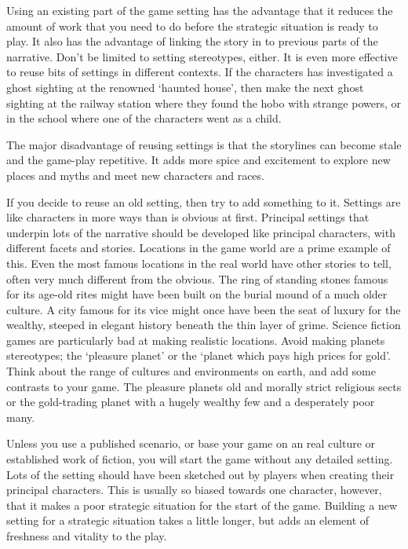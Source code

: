 \documentclass[twoside]{book}
\begin{document}
Using an existing part of the game setting has the advantage that it
reduces the amount of work that you need to do before the strategic
situation is ready to play. It also has the advantage of linking the
story in to previous parts of the narrative. Don't be limited to
setting stereotypes, either. It is even more effective to reuse bits
of settings in different contexts. If the characters has investigated
a ghost sighting at the renowned `haunted house', then make the next
ghost sighting at the railway station where they found the hobo with
strange powers, or in the school where one of the characters went as a
child.

The major disadvantage of reusing settings is that the storylines can
become stale and the game-play repetitive. It adds more spice and
excitement to explore new places and myths and meet new characters and
races.

If you decide to reuse an old setting, then try to add something to
it. Settings are like characters in more ways than is obvious at
first. Principal settings that underpin lots of the narrative should
be developed like principal characters, with different facets and
stories. Locations in the game world are a prime example of this. Even
the most famous locations in the real world have other stories to
tell, often very much different from the obvious. The ring of standing
stones famous for its age-old rites might have been built on the
burial mound of a much older culture. A city famous for its vice might
once have been the seat of luxury for the wealthy, steeped in elegant
history beneath the thin layer of grime. Science fiction games are
particularly bad at making realistic locations. Avoid making planets
stereotypes; the `pleasure planet' or the `planet which pays high
prices for gold'. Think about the range of cultures and environments
on earth, and add some contrasts to your game. The pleasure planets
old and morally strict religious sects or the gold-trading planet with
a hugely wealthy few and a desperately poor many.

Unless you use a published scenario, or base your game on an real
culture or established work of fiction, you will start the game
without any detailed setting. Lots of the setting should have been
sketched out by players when creating their principal characters. This
is usually so biased towards one character, however, that it makes a
poor strategic situation for the start of the game. Building a new
setting for a strategic situation takes a little longer, but adds an
element of freshness and vitality to the play.
\end{document}
